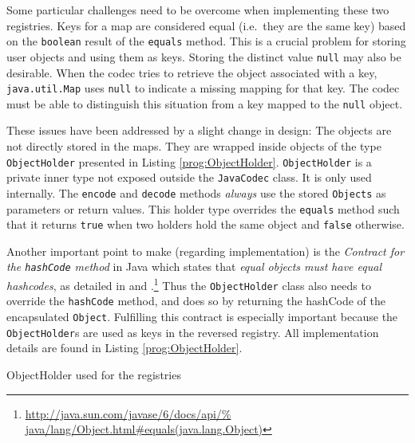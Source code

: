 Some particular challenges need to be overcome
when implementing these two registries.
Keys for a map are considered equal (i.e.\ they are the same key)
based on the \verb=boolean= result of the \verb=equals= method.
This is a crucial problem for storing user objects
and using them as keys.
Storing the distinct value \verb=null= may also be desirable.
When the codec tries to retrieve the object associated with a key,
\verb=java.util.Map= uses \verb=null=
to indicate a missing mapping for that key.
The codec must be able to distinguish this situation from a key mapped to the 
\verb=null= object.

These issues have been addressed by a slight change in design:
The objects are not directly stored in the maps.
They are wrapped inside objects of the type \verb=ObjectHolder=
presented in Listing \ref{prog:ObjectHolder}.
\verb=ObjectHolder= is a private inner type
not exposed outside the \verb=JavaCodec= class.
It is only used internally.
The \verb=encode= and \verb=decode= methods
\emph{always} use the stored \verb=Objects= as parameters or return values.
This holder type overrides the \verb=equals= method such that
it returns \verb=true= when two holders hold the same object
and \verb=false= otherwise.

Another important point to make (regarding implementation) is
the \emph{Contract for the \texttt{hashCode} method} in Java
which states that \emph{equal objects must have equal hashcodes},
as detailed in \citep{website:equals-hashcode}
and \citep{website:java-api}.\footnote{\raggedright%
	\url{http://java.sun.com/javase/6/docs/api/%
	java/lang/Object.html\#equals(java.lang.Object)}}
Thus the \verb=ObjectHolder= class also needs to override
the \verb=hashCode= method, and does so
by returning the hashCode of the encapsulated \verb=Object=.
Fulfilling this contract is especially important
because the \verb=ObjectHolder=s are used as keys in the reversed registry.
All implementation details are found in Listing \ref{prog:ObjectHolder}.

\begin{program}
\caption{ObjectHolder used for the registries\label{prog:ObjectHolder}}
\end{program}
